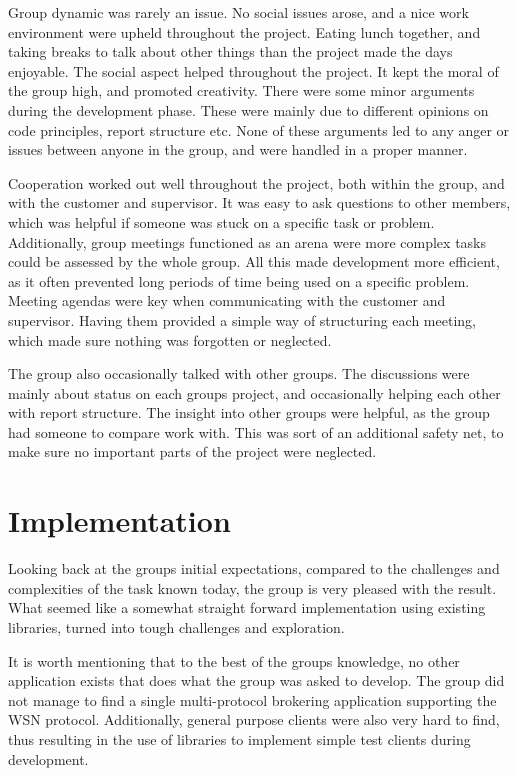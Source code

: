 Group dynamic was rarely an issue. No social issues arose, and a nice work environment were upheld throughout the project. Eating lunch together, and taking breaks to talk about other things than the project made the days enjoyable. The social aspect helped throughout the project. It kept the moral of the group high, and promoted creativity. There were some minor arguments during the development phase. These were mainly due to different opinions on code principles, report structure etc. None of these arguments led to any anger or issues between anyone in the group, and were handled in a proper manner.

Cooperation worked out well throughout the project, both within the group, and with the customer and supervisor. It was easy to ask questions to other members, which was helpful if someone was stuck on a specific task or problem. Additionally, group meetings functioned as an arena were more complex tasks could be assessed by the whole group. All this made development more efficient, as it often prevented long periods of time being used on a specific problem. Meeting agendas were key when communicating with the customer and supervisor. Having them provided a simple way of structuring each meeting, which made sure nothing was forgotten or neglected.

The group also occasionally talked with other groups. The discussions were mainly about status on each groups project, and occasionally helping each other with report structure. The insight into other groups were helpful, as the group had someone to compare work with. This was sort of an additional safety net, to make sure no important parts of the project were neglected.

\section{Implementation}
\label{sec:Implementation}

Looking back at the groups initial expectations, compared to the challenges and complexities of the task known today, the group is very pleased with the result. What seemed like a somewhat straight forward implementation using existing libraries, turned into tough challenges and exploration.

It is worth mentioning that to the best of the groups knowledge, no other application exists that does what the group was asked to develop. The group did not manage to find a single multi-protocol brokering application supporting the WSN protocol. Additionally, general purpose clients were also very hard to find, thus resulting in the use of libraries to implement simple test clients during development.

